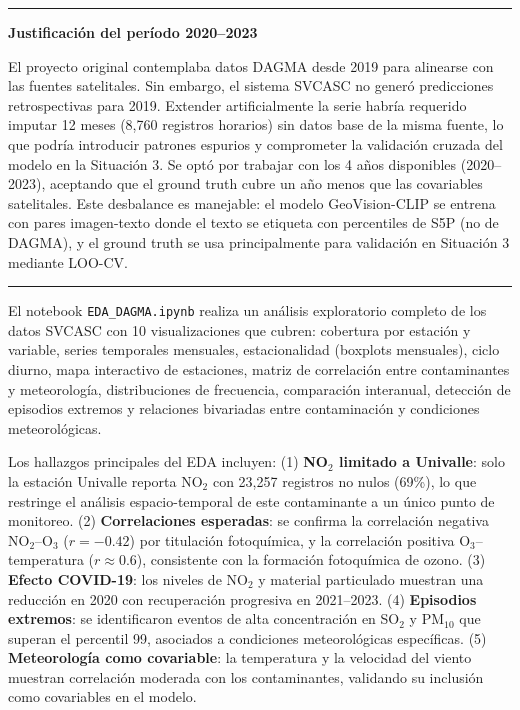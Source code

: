 \documentclass[10pt,a4paper,twocolumn]{article}
\begin{document}
\vspace{0.1cm}
\noindent\rule{\columnwidth}{0.3pt}\par\vspace{0.15cm}
{\small\bfseries Justificación del período 2020--2023}\par\vspace{0.1cm}

El proyecto original contemplaba datos DAGMA desde 2019 para alinearse con las fuentes satelitales. Sin embargo, el sistema SVCASC no generó predicciones retrospectivas para 2019. Extender artificialmente la serie habría requerido imputar 12 meses (8,760 registros horarios) sin datos base de la misma fuente, lo que podría introducir patrones espurios y comprometer la validación cruzada del modelo en la Situación 3. Se optó por trabajar con los 4 años disponibles (2020--2023), aceptando que el ground truth cubre un año menos que las covariables satelitales. Este desbalance es manejable: el modelo GeoVision-CLIP se entrena con pares imagen-texto donde el texto se etiqueta con percentiles de S5P (no de DAGMA), y el ground truth se usa principalmente para validación en Situación 3 mediante LOO-CV.

\vspace{0.1cm}
\noindent\rule{\columnwidth}{0.3pt}\par\vspace{0.15cm}
\par\vspace{0.1em}

El notebook \texttt{EDA\_DAGMA.ipynb} realiza un análisis exploratorio completo de los datos SVCASC con 10 visualizaciones que cubren: cobertura por estación y variable, series temporales mensuales, estacionalidad (boxplots mensuales), ciclo diurno, mapa interactivo de estaciones, matriz de correlación entre contaminantes y meteorología, distribuciones de frecuencia, comparación interanual, detección de episodios extremos y relaciones bivariadas entre contaminación y condiciones meteorológicas.

Los hallazgos principales del EDA incluyen: (1) \textbf{NO$_2$ limitado a Univalle}: solo la estación Univalle reporta NO$_2$ con 23,257 registros no nulos (69\%), lo que restringe el análisis espacio-temporal de este contaminante a un único punto de monitoreo. (2) \textbf{Correlaciones esperadas}: se confirma la correlación negativa NO$_2$--O$_3$ ($r=-0.42$) por titulación fotoquímica, y la correlación positiva O$_3$--temperatura ($r\approx0.6$), consistente con la formación fotoquímica de ozono. (3) \textbf{Efecto COVID-19}: los niveles de NO$_2$ y material particulado muestran una reducción en 2020 con recuperación progresiva en 2021--2023. (4) \textbf{Episodios extremos}: se identificaron eventos de alta concentración en SO$_2$ y PM$_{10}$ que superan el percentil 99, asociados a condiciones meteorológicas específicas. (5) \textbf{Meteorología como covariable}: la temperatura y la velocidad del viento muestran correlación moderada con los contaminantes, validando su inclusión como covariables en el modelo.
\end{document}
